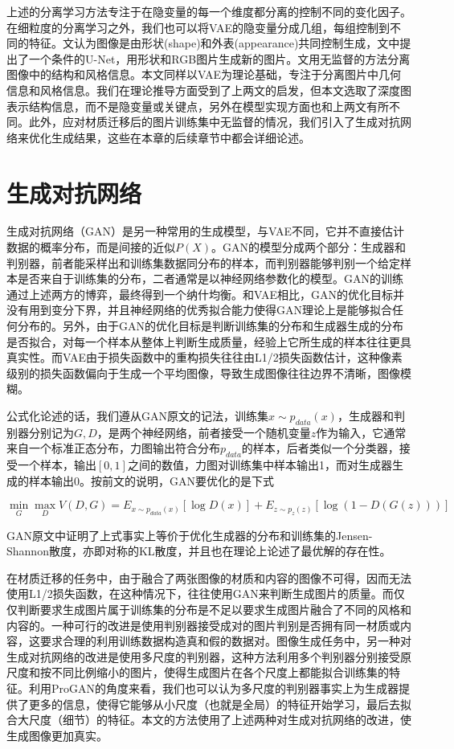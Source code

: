 \documentclass[UTF8,openany,AutoFakeBold,AutoFakeSlant,cs4size]{ctexbook}
\begin{document}
上述的分离学习方法专注于在隐变量的每一个维度都分离的控制不同的变化因子。在细粒度的分离学习之外，我们也可以将VAE的隐变量分成几组，每组控制到不同的特征。\cite{vunet2018}文认为图像是由形状(shape)和外表(appearance)共同控制生成，文中提出了一个条件的U-Net，用形状和RGB图片生成新的图片。\cite{Wu2019DisentanglingCA}文用无监督的方法分离图像中的结构和风格信息。本文同样以VAE为理论基础，专注于分离图片中几何信息和风格信息。我们在理论推导方面受到了上两文的启发，但本文选取了深度图表示结构信息，而不是隐变量\cite{vunet2018}或关键点\cite{Wu2019DisentanglingCA}，另外在模型实现方面也和上两文有所不同。此外，应对材质迁移后的图片训练集中无监督的情况，我们引入了生成对抗网络来优化生成结果，这些在本章的后续章节中都会详细论述。

\section{生成对抗网络}

生成对抗网络（GAN）是另一种常用的生成模型，与VAE不同，它并不直接估计数据的概率分布，而是间接的近似$P(X)$。GAN的模型分成两个部分：生成器和判别器，前者能采样出和训练集数据同分布的样本，而判别器能够判别一个给定样本是否来自于训练集的分布，二者通常是以神经网络参数化的模型。GAN的训练通过上述两方的博弈，最终得到一个纳什均衡。和VAE相比，GAN的优化目标并没有用到变分下界，并且神经网络的优秀拟合能力使得GAN理论上是能够拟合任何分布的。另外，由于GAN的优化目标是判断训练集的分布和生成器生成的分布是否拟合，对每一个样本从整体上判断生成质量，经验上它所生成的样本往往更具真实性。而VAE由于损失函数中的重构损失往往由L1/2损失函数估计，这种像素级别的损失函数偏向于生成一个平均图像，导致生成图像往往边界不清晰，图像模糊。

公式化论述的话，我们遵从GAN原文的记法，训练集$x \sim p_{data}(x)$，生成器和判别器分别记为$G, D$，是两个神经网络，前者接受一个随机变量$z$作为输入，它通常来自一个标准正态分布，力图输出符合分布$p_{data}$的样本，后者类似一个分类器，接受一个样本，输出$[0, 1]$之间的数值，力图对训练集中样本输出1，而对生成器生成的样本输出0。按前文的说明，GAN要优化的是下式

\begin{equation}
	\min_{G} \max_{D} V(D, G) = E_{x \sim p_{data}(x)}[\log D(x)] + E_{z \sim p_{z}(z)}[\log (1 - D(G(z)))]
\end{equation}

GAN原文中证明了上式事实上等价于优化生成器的分布和训练集的Jensen-Shannon散度，亦即对称的KL散度，并且也在理论上论述了最优解的存在性。


在材质迁移的任务中，由于融合了两张图像的材质和内容的图像不可得，因而无法使用L1/2损失函数，在这种情况下，往往使用GAN来判断生成图片的质量。而仅仅判断要求生成图片属于训练集的分布是不足以要求生成图片融合了不同的风格和内容的。一种可行的改进是使用判别器接受成对的图片判别是否拥有同一材质或内容\cite{ma2017pose}，这要求合理的利用训练数据构造真和假的数据对。图像生成任务中，另一种对生成对抗网络的改进是使用多尺度的判别器，这种方法利用多个判别器分别接受原尺度和按不同比例缩小的图片，使得生成图片在各个尺度上都能拟合训练集的特征。利用ProGAN\cite{Karras2017ProgressiveGO}的角度来看，我们也可以认为多尺度的判别器事实上为生成器提供了更多的信息，使得它能够从小尺度（也就是全局）的特征开始学习，最后去拟合大尺度（细节）的特征。本文的方法使用了上述两种对生成对抗网络的改进，使生成图像更加真实。
\end{document}
